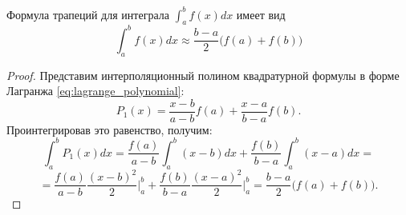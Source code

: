 \documentclass[../main.tex]{subfile}
\begin{document}
\begin{theorem}\label{eq:trapezoidal_rule}
	Формула трапеций для интеграла $\int_a^b f(x)dx$ имеет
	вид
	\[\boxed{\int_a^b f(x)dx\approx\frac{b-a}{2}\big(f(a)+f(b)\big)}\]
\end{theorem}

\begin{proof}
	Представим интерполяционный полином квадратурной формулы в форме
	Лагранжа \eqref{eq:lagrange_polynomial}:
	\[P_1(x)=\frac{x-b}{a-b}f(a)+\frac{x-a}{b-a}f(b).\]
	Проинтегрировав это равенство, получим:
	\[\int_a^b P_1(x)dx=\frac{f(a)}{a-b}\int_a^b (x-b)dx +
	\frac{f(b)}{b-a}\int_a^b (x-a)dx=\]
	\[=\frac{f(a)}{a-b}\frac{(x-b)^2}{2}\Big|_a^b+\frac{f(b)}{b-a}
	\frac{(x-a)^2}{2}\Big|_a^b=\frac{b-a}{2}\big(f(a)+f(b)\big).\]
\end{proof}
\end{document}
